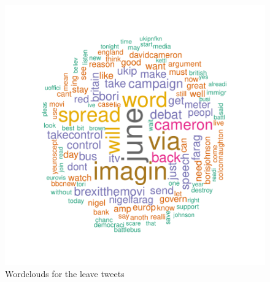 \documentclass[10pt]{article}
\begin{document}
\begin{figure}[H]
\begin{center}
\begin{Schunk}
\end{Schunk}
\includegraphics{submission-030}
\caption {Wordclouds for the leave tweets}
\label{fig11}
\end {center}
\end {figure}
\end{document}

